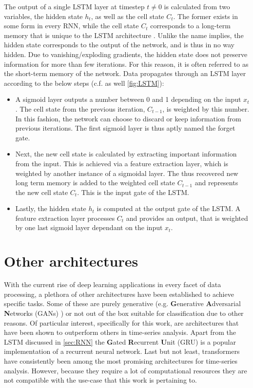 The output of a single LSTM layer at timestep $t\neq0$ is calculated from two variables, the hidden state $h_t$, as well as the cell state $C_t$. The former exists in 
some form in every RNN, while the cell state $C_t$ corresponds to a long-term memory that is unique to the LSTM architecture \cite{gers2000learning}. Unlike the name 
implies, the hidden state corresponds to the output of the network, and is thus in no way hidden. Due to vanishing/exploding gradients, the hidden state does not 
preserve information for more than few iterations. For this reason, it is often referred to as the short-term memory of the network. Data propagates through an LSTM 
layer according to the below steps (c.f. as well \autoref{fig:LSTM}):

\begin{itemize}
	\item A sigmoid layer outputs a number between 0 and 1 depending on the input $x_t$. The cell state from the previous iteration, $C_{t-1}$, is weighted by this 
	number. In this fashion, the network can choose to discard or keep information from previous iterations. The first sigmoid layer is thus aptly named the 
	forget gate.
	\item Next, the new cell state is calculated by extracting important information from the input. This is achieved via a feature extraction layer, which is 
	weighted by another instance of a sigmoidal layer. The thus recovered new long term memory is added to the weighted cell state $C_{t-1}$ and represents the new 
	cell state $C_t$. This is the input gate of the LSTM.
	\item Lastly, the hidden state $h_t$ is computed at the output gate of the LSTM. A feature extraction layer processes $C_t$ and provides an output, that is 
	weighted by one last sigmoid layer dependant on the input $x_t$.
\end{itemize}

\section{Other architectures}
\label{sec:NN-other}

With the current rise of deep learning applications in every facet of data processing, a plethora of other architectures have been established to achieve specific
tasks. Some of these are purely generative (e.g. \textbf{G}enerative \textbf{A}dversarial \textbf{N}etworks (GANs) \cite{creswell2018generative}) or not out of the 
box suitable for classification due to other reasons. Of particular interest, specifically for this work, are architectures that have been shown to outperform others
in time-series analysis. Apart from the LSTM discussed in \autoref{sec:RNN} the \textbf{G}ated \textbf{R}ecurrent \textbf{U}nit (GRU) \cite{dey2017gate} is a popular 
implementation of a recurrent neural network. Last but not least, transformers \cite{vaswani2017attention} have consistently been among the most promising architectures 
for time-series analysis. However, because they require a lot of computational resources they are not compatible with the use-case that this work is pertaining to.
